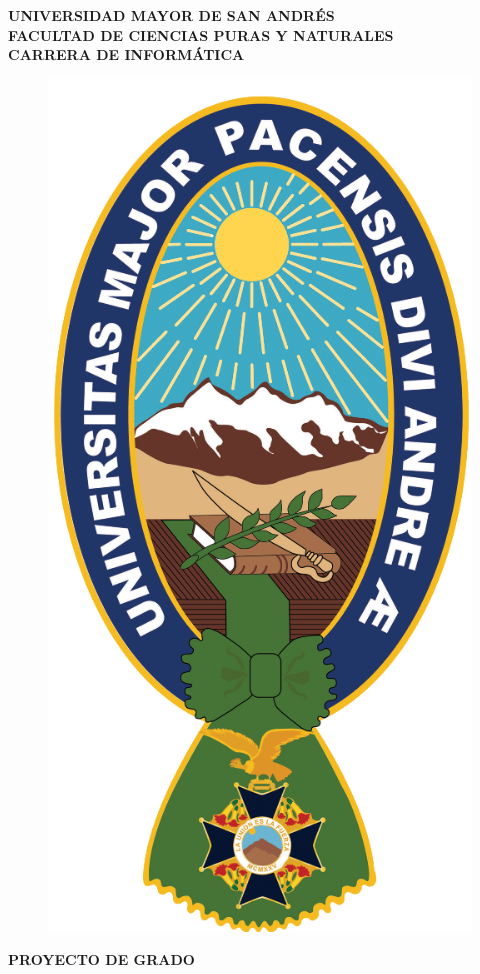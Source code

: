 \begin{titlepage}
	\begin{center}
		{\textbf{UNIVERSIDAD MAYOR DE SAN ANDRÉS}}\\
		{\textbf{FACULTAD DE CIENCIAS PURAS Y NATURALES}}\\
		{\textbf{CARRERA DE INFORMÁTICA}}\\
		\vspace{5mm}
		\begin{figure}[h]
			\centering
			\includegraphics[scale=1.09]{imagenes/Logo_UMSA.png}
		\end{figure}
		\vspace{3mm}
		{\textbf{PROYECTO DE GRADO}}\\
		

\end{center}
\end{titlepage}
